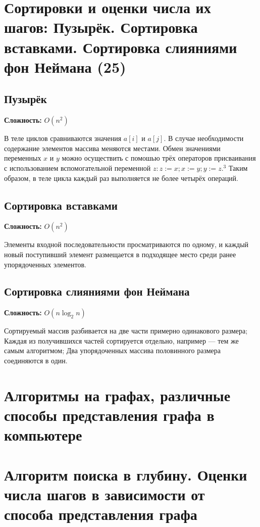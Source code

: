 \documentclass[40pt]{article}
\begin{document}
\section{Сортировки и оценки числа их шагов: Пузырёк. Сортировка вставками. Сортировка слияниями фон Неймана (25)}

\subsection{Пузырёк}

\textbf{Сложность:} $O(n^2)$

В теле циклов сравниваются значения $a[i]$ и $a[j]$. В случае необходимости содержание элементов массива меняются местами. Обмен значениями переменных $x$ и $y$ можно осуществить с помошью трёх операторов присваивания с использованием вспомогательной переменной $z: z:=x ; x:=y ; y:=z .^{3}$ Таким образом, в теле цикла каждый раз выполняется не более четырёх операций.


\subsection{Сортировка вставками}

\textbf{Сложность:} $O(n^2)$

Элементы входной последовательности просматриваются по одному, и каждый новый поступивший элемент размещается в подходящее место среди ранее упорядоченных элементов.

\subsection{Сортировка слияниями фон Неймана}

\textbf{Сложность:} $O(n \log_{2} n)$

Сортируемый массив разбивается на две части примерно одинакового размера; Каждая из получившихся частей сортируется отдельно, например — тем же самым алгоритмом; Два упорядоченных массива половинного размера соединяются в один.


\section{Алгоритмы на графах, различные способы представления графа в компьютере}
\section{Алгоритм поиска в глубину. Оценки числа шагов в зависимости от способа представления графа}
\end{document}
